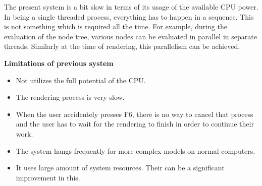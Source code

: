 The present system is a bit slow in terms of its usage of the available CPU power. In being a single threaded process, everything has to happen in a sequence. This is not something which is required all the time. For example, during the evaluation of the node tree, various nodes can be evaluated in parallel in separate threads. Similarly at the time of rendering, this parallelism can be achieved.

{\bf {Limitations of previous system }}
\begin{itemize}
	\item Not utilizes the full potential of the CPU.
	\item The rendering process is very slow.
	\item When the user accidentely presses F6, there is no way to cancel that process and the user has to wait for the rendering to finish in order to continue their work.
	\item The system hangs frequently for more complex models on normal computers.
	\item It uses large amount of system resources. Their can be a significant improvement in this.
\end{itemize}
